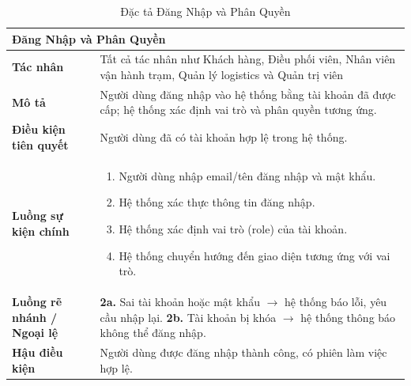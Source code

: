 \begin{table}[H]
  \centering
  \begin{tabularx}{\textwidth}{|l|X|}
    \hline
    \multicolumn{2}{|l|}{\textbf{Đăng Nhập và Phân Quyền}} \\
    \hline
    \textbf{Tác nhân}           & Tất cả tác nhân như Khách hàng, Điều phối viên, Nhân viên vận hành trạm, Quản lý logistics và Quản trị viên \\ \hline
    \textbf{Mô tả}              & Người dùng đăng nhập vào hệ thống bằng tài khoản đã được cấp; hệ thống xác định vai trò và phân quyền tương ứng. \\ \hline
    \textbf{Điều kiện tiên quyết} & Người dùng đã có tài khoản hợp lệ trong hệ thống. \\ \hline
    \textbf{Luồng sự kiện chính} &
      \begin{enumerate}[leftmargin=*, nosep, topsep=0pt]
        \item Người dùng nhập email/tên đăng nhập và mật khẩu.
        \item Hệ thống xác thực thông tin đăng nhập.
        \item Hệ thống xác định vai trò (role) của tài khoản.
        \item Hệ thống chuyển hướng đến giao diện tương ứng với vai trò.
      \end{enumerate} \\ \hline
    \textbf{Luồng rẽ nhánh / Ngoại lệ} &
      \textbf{2a.} Sai tài khoản hoặc mật khẩu $\rightarrow$ hệ thống báo lỗi, yêu cầu nhập lại.
      \newline
      \textbf{2b.} Tài khoản bị khóa $\rightarrow$ hệ thống thông báo không thể đăng nhập. \\ \hline
    \textbf{Hậu điều kiện}      & Người dùng được đăng nhập thành công, có phiên làm việc hợp lệ. \\
    \hline
  \end{tabularx}
  \caption{Đặc tả Đăng Nhập và Phân Quyền}
  \label{tab:uc01}
\end{table}

